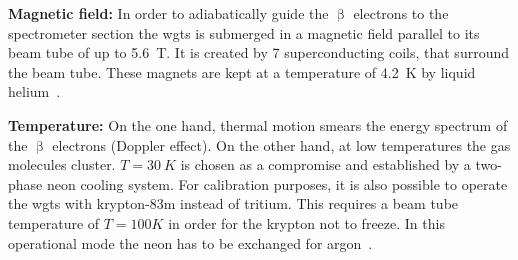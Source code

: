 {\par\textbf{Magnetic field:}
In order to adiabatically guide the $\upbeta$ electrons to the spectrometer section the \gls{wgts} is submerged in a magnetic field parallel to its beam tube of up to \SI{5.6}{T}. It is created by 7 superconducting coils, that surround the beam tube. These magnets are kept at a temperature of \SI{4.2}{K} by liquid helium~\cite{Arenz2018}.}

{\par\textbf{Temperature:}
On the one hand, thermal motion smears the energy spectrum of the $\upbeta$ electrons (Doppler effect). On the other hand, at low temperatures the gas molecules cluster. $T=\SI{30}{K}$ is chosen as a compromise and established by a two-phase neon cooling system. For calibration purposes, it is also possible to operate the \gls{wgts} with krypton-83m instead of tritium. This requires a beam tube temperature of $T=100K$ in order for the krypton not to freeze. In this operational mode the neon has to be exchanged for argon~\cite{Angrik:2005ep}.}
